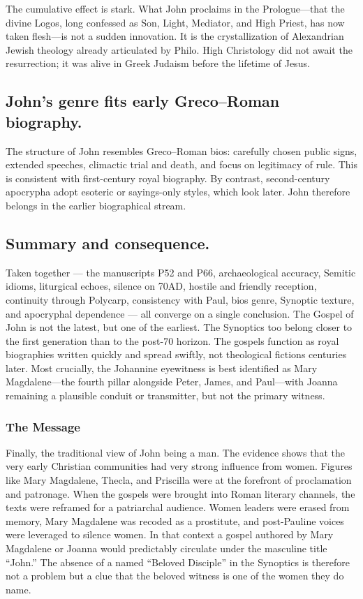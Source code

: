 The cumulative effect is stark.
What John proclaims in the Prologue---that the divine Logos, long confessed as Son, Light, Mediator, and High Priest, has now taken flesh---is not a sudden innovation.
It is the crystallization of Alexandrian Jewish theology already articulated by Philo.
High Christology did not await the resurrection; it was alive in Greek Judaism before the lifetime of Jesus.

\subsection{John’s genre fits early Greco--Roman biography.}\label{subsec:johns-genre-fits-early-greco-roman-biography.}

The structure of John resembles Greco--Roman bios: carefully chosen public signs, extended speeches, climactic trial and death, and focus on legitimacy of rule.
This is consistent with first-century royal biography.
By contrast, second-century apocrypha adopt esoteric or sayings-only styles, which look later.
John therefore belongs in the earlier biographical stream.

\subsection{Summary and consequence.}\label{subsec:summary-and-consequence.}

Taken together --- the manuscripts P52 and P66, archaeological accuracy, Semitic idioms, liturgical echoes, silence on 70AD, hostile and friendly reception, continuity through Polycarp, consistency with Paul, bios genre, Synoptic texture, and apocryphal dependence --- all converge on a single conclusion.
The Gospel of John is not the latest, but one of the earliest.
The Synoptics too belong closer to the first generation than to the post-70 horizon.
The gospels function as royal biographies written quickly and spread swiftly, not theological fictions centuries later.
Most crucially, the Johannine eyewitness is best identified as Mary Magdalene---the fourth pillar alongside Peter, James, and Paul---with Joanna remaining a plausible conduit or transmitter, but not the primary witness.

\subsubsection{The Message}\label{subsubsec:the-message}

Finally, the traditional view of John being a man.
The evidence shows that the very early Christian communities had very strong influence from women.
Figures like Mary Magdalene, Thecla, and Priscilla were at the forefront of proclamation and patronage.
When the gospels were brought into Roman literary channels, the texts were reframed for a patriarchal audience.
Women leaders were erased from memory, Mary Magdalene was recoded as a prostitute, and post-Pauline voices were leveraged to silence women.
In that context a gospel authored by Mary Magdalene or Joanna would predictably circulate under the masculine title “John.”
The absence of a named “Beloved Disciple” in the Synoptics is therefore not a problem but a clue that the beloved witness is one of the women they do name.

